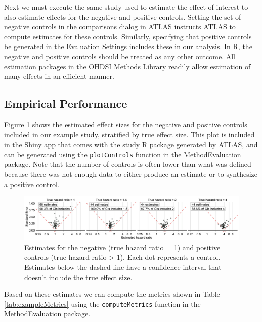 \documentclass[11pt]{book}
\theoremstyle{definition}
\theoremstyle{definition}
\theoremstyle{definition}
\theoremstyle{remark}
\begin{document}
Next we must execute the same study used to estimate the effect of
interest to also estimate effects for the negative and positive
controls. Setting the set of negative controls in the comparisons dialog
in ATLAS instructs ATLAS to compute estimates for these controls.
Similarly, specifying that positive controls be generated in the
Evaluation Settings includes these in our analysis. In R, the negative
and positive controls should be treated as any other outcome. All
estimation packages in the
\href{https://ohdsi.github.io/MethodsLibrary/}{OHDSI Methods Library}
readily allow estimation of many effects in an efficient manner.

\subsection{Empirical Performance}\label{empirical-performance}

Figure \ref{fig:controls} shows the estimated effect sizes for the
negative and positive controls included in our example study, stratified
by true effect size. This plot is included in the Shiny app that comes
with the study R package generated by ATLAS, and can be generated using
the \texttt{plotControls} function in the
\href{https://ohdsi.github.io/MethodEvaluation/}{MethodEvaluation}
package. Note that the number of controls is often lower than what was
defined because there was not enough data to either produce an estimate
or to synthesize a positive control.

\begin{figure}

{\centering \includegraphics[width=1\linewidth]{images/MethodValidity/controls} 

}

\caption{Estimates for the negative (true hazard ratio = 1) and positive controls (true hazard ratio > 1). Each dot represents a control. Estimates below the dashed line have a confidence interval that doesn't include the true effect size.}\label{fig:controls}
\end{figure}

Based on these estimates we can compute the metrics shown in Table
\ref{tab:exampleMetrics} using the \texttt{computeMetrics} function in
the \href{https://ohdsi.github.io/MethodEvaluation/}{MethodEvaluation}
package.
\end{document}
